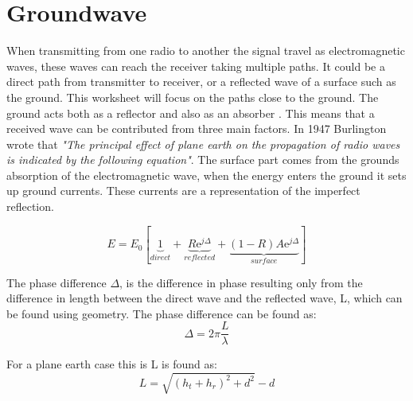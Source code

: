 \chapter{Groundwave}

When transmitting from one radio to another the signal travel as electromagnetic waves, these waves can reach the receiver taking multiple paths. It could be a direct path from transmitter to receiver, or a reflected wave of a surface such as the ground. This worksheet will focus on the paths close to the ground. The ground acts both as a reflector and also as an absorber \citep{Bullington}. This means that a received wave can be contributed from three main factors. In 1947 Burlington wrote that \textit{"The principal effect of plane earth on the propagation of radio waves is indicated by the following equation"}\citep{Bullington}. The surface part comes from the grounds absorption of the electromagnetic wave, when the energy enters the ground it sets up ground currents. These currents are a representation of the imperfect reflection.    

\begin{equation}
E=E_0\left[\underbrace{1}_{direct}+\underbrace{R\text{e}^{j\Delta}}_{reflected}+\underbrace{(1-R)A\text{e}^{j\Delta}}_{surface}\right]
\end{equation}
\begin{where}
\end{where}

The phase difference $\Delta$, is the difference in phase resulting only from the difference in length between the direct wave and the reflected wave, L, which can be found using geometry. The phase difference can be found as:
\begin{equation}
\Delta =2\pi \frac{L}{\lambda}
\end{equation}
\begin{where}
\end{where}

For a plane earth case this is L is found as:
\begin{equation}
L=\sqrt{(h_t+h_r)^2+d^2}-d
\end{equation}
\begin{where}
\end{where}

